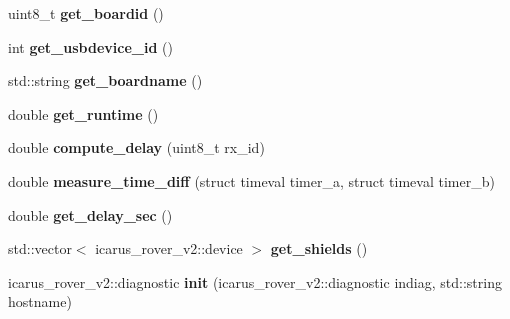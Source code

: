 \begin{DoxyCompactItemize}
\mbox{\label{classBoardControllerNodeProcess_a70818768ae3328bf23b7bd1f7b6180d9}} 
uint8\+\_\+t {\bfseries get\+\_\+boardid} ()
\item 
\mbox{\label{classBoardControllerNodeProcess_a7f8aa19df943f4a7eab1d4529ca8e170}} 
int {\bfseries get\+\_\+usbdevice\+\_\+id} ()
\item 
\mbox{\label{classBoardControllerNodeProcess_aaf90202f5ea312bf2d20533a68cd0faa}} 
std\+::string {\bfseries get\+\_\+boardname} ()
\item 
\mbox{\label{classBoardControllerNodeProcess_ab848514d06e66c9a6fa8addd74c4a850}} 
double {\bfseries get\+\_\+runtime} ()
\item 
\mbox{\label{classBoardControllerNodeProcess_a02d6609a47a05315b0e40634c54faf85}} 
double {\bfseries compute\+\_\+delay} (uint8\+\_\+t rx\+\_\+id)
\item 
\mbox{\label{classBoardControllerNodeProcess_ae4e5997b2ad10d08e08cf696fec56353}} 
double {\bfseries measure\+\_\+time\+\_\+diff} (struct timeval timer\+\_\+a, struct timeval timer\+\_\+b)
\item 
\mbox{\label{classBoardControllerNodeProcess_a4af2e0188a05a0ae024b87c39e705e43}} 
double {\bfseries get\+\_\+delay\+\_\+sec} ()
\item 
\mbox{\label{classBoardControllerNodeProcess_ab6f233686cd6af64d975f0808eedd841}} 
std\+::vector$<$ icarus\+\_\+rover\+\_\+v2\+::device $>$ {\bfseries get\+\_\+shields} ()
\item 
\mbox{\label{classBoardControllerNodeProcess_adaf7a0e40f694edd8b5cecfae66b4f6f}} 
icarus\+\_\+rover\+\_\+v2\+::diagnostic {\bfseries init} (icarus\+\_\+rover\+\_\+v2\+::diagnostic indiag, std\+::string hostname)
\item 
\mbox{\label{classBoardControllerNodeProcess_a92e2bdb8cbd2d2c3cc7f3a86d21a884c}} 

\end{DoxyCompactItemize}
